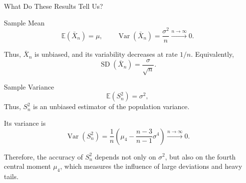 \begin{frame}{What Do These Results Tell Us?}

\small

\begin{keybox}{Sample Mean}
\[
\mathbb{E}(\bar X_n)=\mu,
\qquad
\operatorname{Var}(\bar X_n)=\frac{\sigma^2}{n} \xrightarrow{n\to \infty}{} 0.
\]

Thus, \(\bar X_n\) is unbiased, and its variability decreases at rate \(1/n\).
Equivalently,
\[
\operatorname{SD}(\bar X_n)=\frac{\sigma}{\sqrt n}.
\]
\end{keybox}

\begin{keybox}{Sample Variance}
\[
\mathbb{E}(S_n^2)=\sigma^2,
\]
Thus, \(S_n^2\) is an unbiased estimator of the population variance.

Its variance is
\[
\operatorname{Var}(S_n^2)
=
\frac1n
\left(
\mu_4-\frac{n-3}{n-1}\sigma^4
\right) \xrightarrow{n\to \infty}{} 0.
\]

Therefore, the accuracy of \(S_n^2\) depends not only on \(\sigma^2\), but also
on the fourth central moment \(\mu_4\), which measures the influence of large
deviations and heavy tails.
\end{keybox}


\end{frame}










